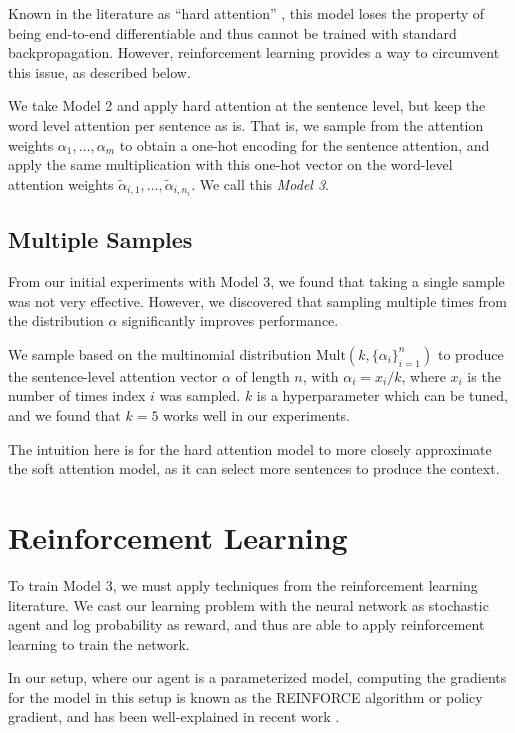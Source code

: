 \documentclass[11pt]{report}
\begin{document}
Known in the literature as ``hard attention'' \citep{xu2015captioning}, this model loses the property of being end-to-end differentiable and thus cannot be trained with standard backpropagation. However, reinforcement learning provides a way to circumvent this issue, as described below.

We take Model 2 and apply hard attention at the sentence level, but keep the word level attention per sentence as is. That is, we sample from the attention weights $\alpha_1, \ldots, \alpha_m$ to obtain a one-hot encoding for the sentence attention, and apply the same multiplication with this one-hot vector on the word-level attention weights $\widetilde{\alpha}_{i,1}, \ldots, \widetilde{\alpha}_{i,n_i}$. We call this \emph{Model 3}.


\subsection{Multiple Samples}

From our initial experiments with Model 3, we found that taking a single sample was not very effective. However, we discovered that sampling multiple times from the distribution $\alpha$ significantly improves performance.

We sample based on the multinomial distribution $\mathrm{Mult}(k, \{\alpha_i\}_{i=1}^n)$ to produce the sentence-level attention vector $\alpha$ of length $n$, with $\alpha_i = x_i / k$, where $x_i$ is the number of times index $i$ was sampled. $k$ is a hyperparameter which can be tuned, and we found that $k=5$ works well in our experiments.

The intuition here is for the hard attention model to more closely approximate the soft attention model, as it can select more sentences to produce the context.

\section{Reinforcement Learning}

To train Model 3, we must apply techniques from the reinforcement learning literature. We cast our learning problem with the neural network as stochastic agent and log probability as reward, and thus are able to apply reinforcement learning to train the network.

In our setup, where our agent is a parameterized model, computing the gradients for the model in this setup is known as the REINFORCE algorithm \citep{williams1992reinforce} or policy gradient, and has been well-explained in recent work \citep{mnih2014visualattention, ba2015visualattention, schulman2015backprop}.
\end{document}
